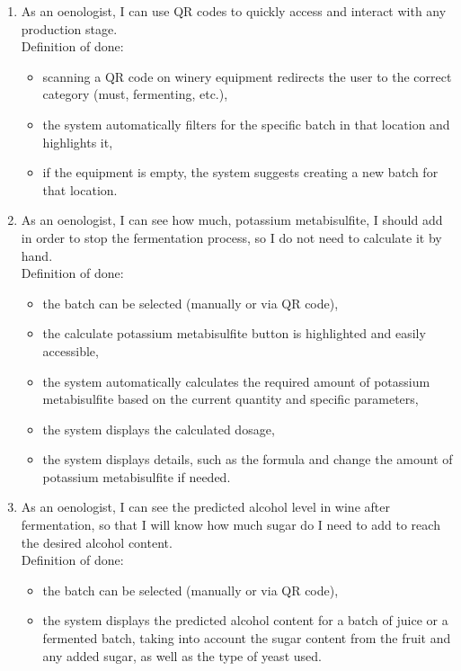 \begin{enumerate}
	\item As an oenologist, I can use QR codes to quickly access and interact with any production stage.
	\\Definition of done:
	\begin{itemize}
		\item scanning a QR code on winery equipment redirects the user to the correct category (must, fermenting, etc.),
		\item the system automatically filters for the specific batch in that location and highlights it,
		\item if the equipment is empty, the system suggests creating a new batch for that location.
	\end{itemize}
	\item As an oenologist, I can see how much, potassium metabisulfite, I should add in order to stop the fermentation process, so I do not need to calculate it by hand.
	\\Definition of done:
	\begin{itemize}
		\item the batch can be selected (manually or via QR code),
		\item the calculate potassium metabisulfite button is highlighted and easily accessible,
		\item the system automatically calculates the required amount of potassium metabisulfite based on the current quantity and specific parameters,
		\item the system displays the calculated dosage,
		\item the system displays details, such as the formula and change the amount of potassium metabisulfite if needed.
	\end{itemize}
	\item As an oenologist, I can see the predicted alcohol level in wine after fermentation, so that I will know how much sugar do I need to add to reach the desired alcohol content.
	\\Definition of done:
	\begin{itemize}
		\item the batch can be selected (manually or via QR code),
		\item the system displays the predicted alcohol content for a batch of juice or a fermented batch, taking into account the sugar content from the fruit and any added sugar, as well as the type of yeast used.

\end{itemize}
\end{enumerate}
